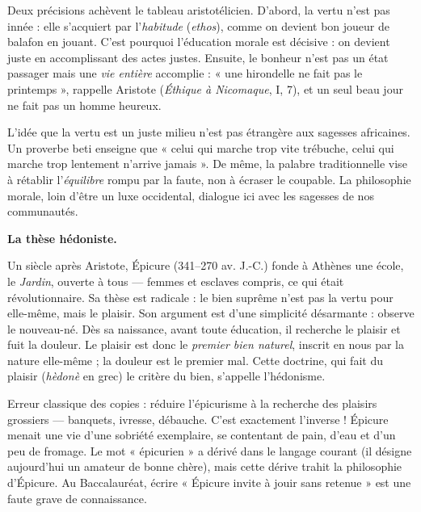 \documentclass[11pt]{article}
\newcommand{\cle}[1]{{\popxbold\color{popdark}#1}}
\newcounter{popsec}
\newcounter{popsub}
\newcommand{\courssub}[1]{%
  \stepcounter{popsub}%
  \par\vspace{9pt}\noindent{\popxbold\fontsize{11.5}{13}\selectfont\color{popink}{\color{poporange}\thepopsec.\thepopsub}\hspace{6pt}#1}\par\nopagebreak\vspace{4pt}
}
\begin{document}
Deux précisions achèvent le tableau aristotélicien. D'abord, la vertu n'est pas innée : elle s'acquiert par l'\emph{habitude} (\emph{ethos}), comme on devient bon joueur de balafon en jouant. C'est pourquoi l'éducation morale est décisive : on devient juste en accomplissant des actes justes. Ensuite, le bonheur n'est pas un état passager mais une \emph{vie entière} accomplie : « une hirondelle ne fait pas le printemps », rappelle Aristote (\emph{Éthique à Nicomaque}, I, 7), et un seul beau jour ne fait pas un homme heureux.

\begin{savaistu}
L'idée que la vertu est un juste milieu n'est pas étrangère aux sagesses africaines. Un proverbe beti enseigne que « celui qui marche trop vite trébuche, celui qui marche trop lentement n'arrive jamais ». De même, la palabre traditionnelle vise à rétablir l'\emph{équilibre} rompu par la faute, non à écraser le coupable. La philosophie morale, loin d'être un luxe occidental, dialogue ici avec les sagesses de nos communautés.
\end{savaistu}

\courssub{L'épicurisme : le plaisir, bien suprême}

\textbf{La thèse hédoniste.}\par
Un siècle après Aristote, Épicure (341--270 av. J.-C.) fonde à Athènes une école, le \emph{Jardin}, ouverte à tous — femmes et esclaves compris, ce qui était révolutionnaire. Sa thèse est radicale : le bien suprême n'est pas la vertu pour elle-même, mais le \cle{plaisir}. Son argument est d'une simplicité désarmante : observe le nouveau-né. Dès sa naissance, avant toute éducation, il recherche le plaisir et fuit la douleur. Le plaisir est donc le \emph{premier bien naturel}, inscrit en nous par la nature elle-même ; la douleur est le premier mal. Cette doctrine, qui fait du plaisir (\emph{hèdonè} en grec) le critère du bien, s'appelle l'\cle{hédonisme}.

\begin{attention}
Erreur classique des copies : réduire l'épicurisme à la recherche des plaisirs grossiers — banquets, ivresse, débauche. C'est exactement l'inverse ! Épicure menait une vie d'une sobriété exemplaire, se contentant de pain, d'eau et d'un peu de fromage. Le mot « épicurien » a dérivé dans le langage courant (il désigne aujourd'hui un amateur de bonne chère), mais cette dérive trahit la philosophie d'Épicure. Au Baccalauréat, écrire « Épicure invite à jouir sans retenue » est une faute grave de connaissance.
\end{attention}
\end{document}
